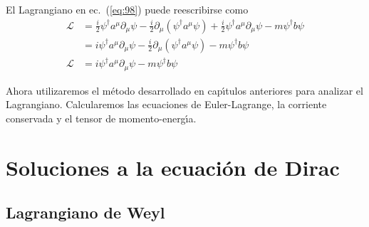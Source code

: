 El Lagrangiano en ec.~(\ref{eq:98}) puede reescribirse como
\begin{align}
  \label{eq:197}
  \mathcal{L}&=\frac{i}{2}\psi^\dagger a^\mu\partial_\mu\psi-\frac{i}{2}\partial_\mu\left(\psi^\dagger a^\mu\psi\right)+\frac{i}{2}\psi^\dagger a^\mu\partial_\mu\psi-m\psi^\dagger b\psi\nonumber\\
  &=i \psi^\dagger a^\mu\partial_\mu\psi-\frac{i}{2}\partial_\mu\left(\psi^\dagger a^\mu\psi\right)-m\psi^\dagger b\psi\nonumber\\
  \mathcal{L}&=i \psi^\dagger a^\mu\partial_\mu\psi-m\psi^\dagger b\psi
\end{align}

Ahora utilizaremos el m\'etodo desarrollado en cap\'\i tulos anteriores para analizar el Lagrangiano. Calcularemos las ecuaciones de Euler-Lagrange, la corriente conservada y el tensor de momento-energ\'\i a.


\section{Soluciones a la ecuaci\'on de Dirac}
\label{sec:soluc-la-ecuac}

\subsection{Lagrangiano de Weyl}
\label{sec:lagrangiano-de-weyl}


